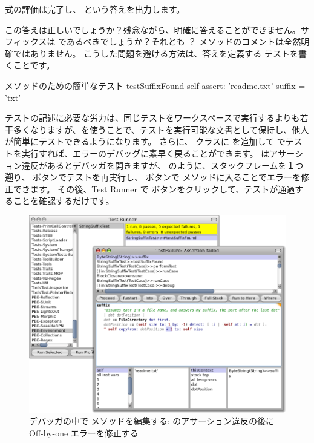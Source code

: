 \documentclass[a4paper,10pt,twoside]{book}
\begin{document}

 式の評価は完了し、 という答えを出力します。

この答えは正しいでしょうか？残念ながら、明確に答えることができません。サフィックスは  であるべきでしょうか？それとも  ？
 メソッドのコメントは全然明確ではありません。
こうした問題を避ける方法は、答えを定義する  テストを書くことです。

\begin{method}[testSuffix]{ メソッドのための簡単なテスト}
testSuffixFound
self assert: 'readme.txt' suffix = 'txt'
\end{method}

テストの記述に必要な労力は、同じテストをワークスペースで実行するよりも若干多くなりますが、\sunit を使うことで、テストを実行可能な文書として保持し、他人が簡単にテストできるようになります。
さらに、 クラスに  を追加して \sunit でテストを実行すれば、エラーのデバッグに素早く戻ることができます。
\sunit はアサーション違反があるとデバッガを開きますが、 のように、スタックフレームを１つ遡り、 ボタンでテストを再実行し、 ボタンで  メソッドに入ることでエラーを修正できます。
その後、\sunit Test Runner で  ボタンをクリックして、テストが通過することを確認するだけです。

\begin{figure}[btp]
\begin{center}
\includegraphics[width=\textwidth]{fixOffByOne}
\end{center}
\caption{デバッガの中で  メソッドを編集する: \sunit のアサーション違反の後にOff-by-one エラーを修正する}
\end{figure}
\end{document}
